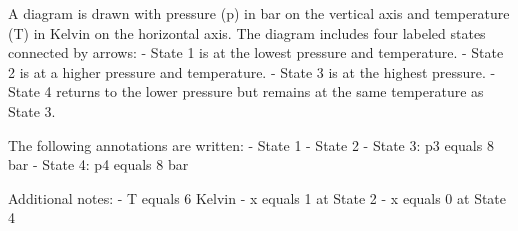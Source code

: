A diagram is drawn with pressure (p) in bar on the vertical axis and temperature (T) in Kelvin on the horizontal axis. The diagram includes four labeled states connected by arrows:  
- State 1 is at the lowest pressure and temperature.  
- State 2 is at a higher pressure and temperature.  
- State 3 is at the highest pressure.  
- State 4 returns to the lower pressure but remains at the same temperature as State 3.  

The following annotations are written:  
- State 1  
- State 2  
- State 3: p3 equals 8 bar  
- State 4: p4 equals 8 bar  

Additional notes:  
- T equals 6 Kelvin  
- x equals 1 at State 2  
- x equals 0 at State 4
